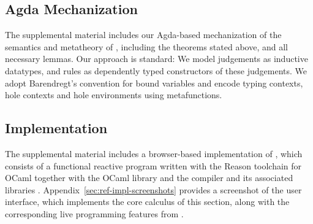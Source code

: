 

\subsection{Agda Mechanization}
\label{sec:agda-mechanization}
\vspace{-3px}

The supplemental material includes our Agda-based
mechanization  \cite{norell2009dependently,norell:thesis} 
of the semantics and metatheory of \HazelnutLive, 
including the theorems stated above, and all necessary lemmas. 
%
%
%
%
%
Our approach is standard: We model judgements as 
inductive datatypes, and rules as dependently typed constructors of these judgements. 
%
We adopt Barendregt's convention for bound variables \cite{urban,barendregt84:_lambda_calculus} and encode typing 
contexts, hole contexts and hole environments using metafunctions.

\subsection{Implementation}\label{sec:implementation}

The supplemental material includes a browser-based implementation
of \HazelnutLive, which consists of a functional reactive program
%
%
%
written with the Reason toolchain for OCaml \cite{reason-what,leroy03:_ocaml} 
together with the OCaml  library \cite{OcamlReact} 
and the  compiler and its associated libraries \cite{vouillon2014bytecode}. 
%
Appendix~\ref{sec:ref-impl-screenshots} provides a screenshot of the user interface, 
which implements the core calculus of this section, 
along with the corresponding live programming features from .

